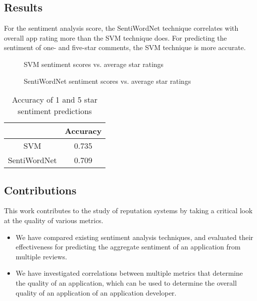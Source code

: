 \documentclass{acm_proc_article-sp}
\begin{document}
\subsection{Results}
For the sentiment analysis score, the SentiWordNet technique correlates with overall app rating more than the SVM technique does.  For predicting the sentiment of one- and five-star comments, the SVM technique is more accurate.

\begin{figure}[!h]
\centering
{}
\caption{SVM sentiment scores vs. average star ratings}
\label{fig:myfig1}
\end{figure}

\begin{figure}[!h]
\centering
{}
\caption{SentiWordNet sentiment scores vs. average star ratings}
\label{fig:myfig2}
\end{figure}

\begin{table}[!h]
\centering
\caption{Accuracy of 1 and 5 star sentiment predictions}
\begin{tabular}{|c|c|}
\hline
& \textbf{Accuracy} \\ \hline
SVM & 0.735 \\ \hline
SentiWordNet & 0.709 \\ \hline
\end{tabular}
\end{table}

\subsection{Contributions}
This work contributes to the study of reputation systems by taking a critical look at the quality of various metrics.
\begin{itemize}
\item{We have compared existing sentiment analysis techniques, and evaluated their effectiveness for predicting the aggregate sentiment of an application from multiple reviews.}
\item{We have investigated correlations between multiple metrics that determine the quality of an application, which can be used to determine the overall quality of an application of an application developer.}
\end{itemize}



\balancecolumns
\end{document}

